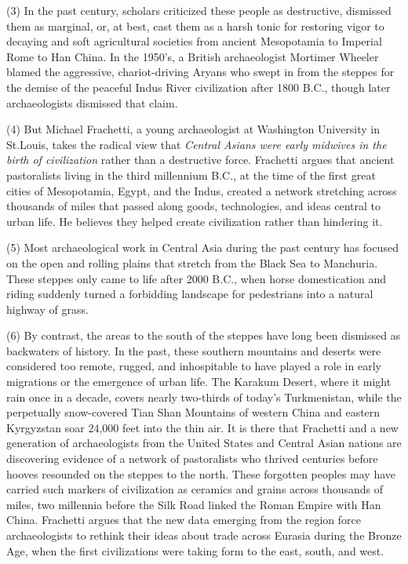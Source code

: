 \documentclass[UTF8,11pt]{ctexart}
\begin{document}
(3) In the past century, scholars criticized these people as destructive, dismissed them as marginal, or, at best, cast them as a harsh tonic for restoring vigor to decaying and soft agricultural societies from ancient Mesopotamia to Imperial Rome to Han China. In the 1950’s, a British archaeologist Mortimer Wheeler blamed the aggressive, chariot-driving Aryans who swept in from the steppes for the demise of the peaceful Indus River civilization after 1800 B.C., though later archaeologists dismissed that claim.


(4) But Michael Frachetti, a young archaeologist at Washington University in St.Louis, takes the radical view that \textit{Central Asians were early midwives in the birth of civilization} rather than a destructive force. Frachetti argues that ancient pastoralists living in the third millennium B.C., at the time of the first great cities of Mesopotamia, Egypt, and the Indus, created a network stretching across thousands of miles that passed along goods, technologies, and ideas central to urban life. He believes they helped create civilization rather than hindering it.


(5) Most archaeological work in Central Asia during the past century has focused on the open and rolling plains that stretch from the Black Sea to Manchuria. These steppes only came to life after 2000 B.C., when horse domestication and riding suddenly turned a forbidding landscape for pedestrians into a natural highway of grass.


(6) By contrast, the areas to the south of the steppes have long been dismissed as backwaters of history. In the past, these southern mountains and deserts were considered too remote, rugged, and inhospitable to have played a role in early migrations or the emergence of urban life. The Karakum Desert, where it might rain once in a decade, covers nearly two-thirds of today’s Turkmenistan, while the perpetually snow-covered Tian Shan Mountains of western China and eastern Kyrgyzstan soar 24,000 feet into the thin air. It is there that Frachetti and a new generation of archaeologists from the United States and Central Asian nations are discovering evidence of a network of pastoralists who thrived centuries before hooves resounded on the steppes to the north. These forgotten peoples may have carried such markers of civilization as ceramics and grains across thousands of miles, two millennia before the Silk Road linked the Roman Empire with Han China. Frachetti argues that the new data emerging from the region force archaeologists to rethink their ideas about trade across Eurasia during the Bronze Age, when the first civilizations were taking form to the east, south, and west.
\end{document}
